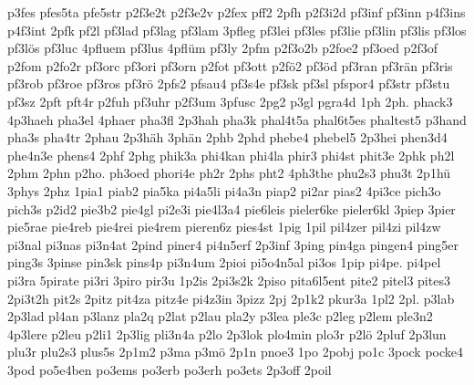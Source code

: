 {    p3fes
    pfes5ta
    pfe5str
    p2f3e2t
    p2f3e2v
    p2fex
    pff2
    2pfh
    p2f3i2d
    pf3inf
    pf3inn
    p4f3ins
    p4f3int
    2pfk
    pf2l
    pf3lad
    pf3lag
    pf3lam
    3pfleg
    pf3lei
    pf3les
    pf3lie
    pf3lin
    pf3lis
    pf3los
    pf3lös
    pf3luc
    4pfluem
    pf3lus
    4pflüm
    pf3ly
    2pfm
    p2f3o2b
    p2foe2
    pf3oed
    p2f3of
    p2fom
    p2fo2r
    pf3orc
    pf3ori
    pf3orn
    p2fot
    pf3ott
    p2fö2
    pf3öd
    pf3ran
    pf3rän
    pf3ris
    pf3rob
    pf3roe
    pf3ros
    pf3rö
    2pfs2
    pfsau4
    pf3s4e
    pf3sk
    pf3sl
    pfspor4
    pf3str
    pf3stu
    pf3sz
    2pft
    pft4r
    p2fuh
    pf3uhr
    p2f3um
    3pfusc
    2pg2
    p3gl
    pgra4d
    1ph
    2ph.
    phack3
    4p3haeh
    pha3el
    4phaer
    pha3fl
    2p3hah
    pha3k
    phal4t5a
    phal6t5es
    phaltest5
    p3hand
    pha3s
    pha4tr
    2phau
    2p3häh
    3phän
    2phb
    2phd
    phebe4
    phebel5
    2p3hei
    phen3d4
    phe4n3e
    phens4
    2phf
    2phg
    phik3a
    phi4kan
    phi4la
    phir3
    phi4st
    phit3e
    2phk
    ph2l
    2phm
    2phn
    p2ho.
    ph3oed
    phori4e
    ph2r
    2phs
    pht2
    4ph3the
    phu2s3
    phu3t
    2p1hü
    3phys
    2phz
    1pia1
    piab2
    pia5ka
    pi4a5li
    pi4a3n
    piap2
    pi2ar
    pias2
    4pi3ce
    pich3o
    pich3s
    p2id2
    pie3b2
    pie4gl
    pi2e3i
    pie4l3a4
    pie6leis
    pieler6ke
    pieler6kl
    3piep
    3pier
    pie5rae
    pie4reb
    pie4rei
    pie4rem
    pieren6z
    pies4st
    1pig
    1pil
    pil4zer
    pil4zi
    pil4zw
    pi3nal
    pi3nas
    pi3n4at
    2pind
    piner4
    pi4n5erf
    2p3inf
    3ping
    pin4ga
    pingen4
    ping5er
    ping3s
    3pinse
    pin3sk
    pins4p
    pi3n4um
    2pioi
    pi5o4n5al
    pi3os
    1pip
    pi4pe.
    pi4pel
    pi3ra
    5pirate
    pi3ri
    3piro
    pir3u
    1p2is
    2pi3s2k
    2piso
    pita6l5ent
    pite2
    pitel3
    pites3
    2pi3t2h
    pit2s
    2pitz
    pit4za
    pitz4e
    pi4z3in
    3pizz
    2pj
    2p1k2
    pkur3a
    1pl2
    2pl.
    p3lab
    2p3lad
    pl4an
    p3lanz
    pla2q
    p2lat
    p2lau
    pla2y
    p3lea
    ple3c
    p2leg
    p2lem
    ple3n2
    4p3lere
    p2leu
    p2li1
    2p3lig
    pli3n4a
    p2lo
    2p3lok
    plo4min
    plo3r
    p2lö
    2pluf
    2p3lun
    plu3r
    plu2s3
    plus5s
    2p1m2
    p3ma
    p3mö
    2p1n
    pnoe3
    1po
    2pobj
    po1c
    3pock
    pocke4
    3pod
    po5e4ben
    po3ems
    po3erb
    po3erh
    po3ets
    2p3off
    2poil
}
